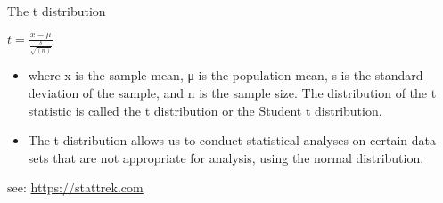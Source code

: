 \documentclass[
  ignorenonframetext,
]{beamer}
\begin{document}
\begin{frame}{The t distribution}
\protect\hypertarget{the-t-distribution-1}{}

\(t = \frac{x - μ}{\frac{s}{\sqrt{(n)}}}\)

\begin{itemize}
\item
  where x is the sample mean, μ is the population mean, s is the
  standard deviation of the sample, and n is the sample size. The
  distribution of the t statistic is called the t distribution or the
  Student t distribution.
\item
  The t distribution allows us to conduct statistical analyses on
  certain data sets that are not appropriate for analysis, using the
  normal distribution.
\end{itemize}

see: \url{https://stattrek.com}

\end{frame}
\end{document}
